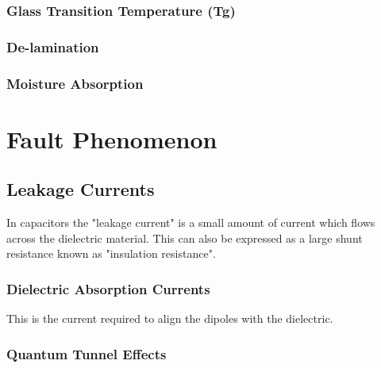 \documentclass{article}
\begin{document}
	\subsubsection{Glass Transition Temperature (Tg)}
	\subsubsection{De-lamination}
	\subsubsection{Moisture Absorption}
	
\newpage

\section{Fault Phenomenon}
\subsection{Leakage Currents}
In capacitors the "leakage current" is a small amount of current which flows across the dielectric material. This can also be expressed as a large shunt resistance known as "insulation resistance".
\subsubsection{Dielectric Absorption Currents}
This is the current required to align the dipoles with the dielectric.
\subsubsection{Quantum Tunnel Effects}


\newpage

\printbibliography
\end{document}
